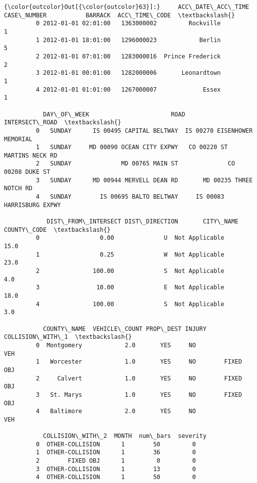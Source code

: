 \documentclass[11pt]{article}
\begin{document}
\begin{Verbatim}[commandchars=\\\{\}]
{\color{outcolor}Out[{\color{outcolor}63}]:}     ACC\_DATE\_ACC\_TIME  CASE\_NUMBER           BARRACK  ACC\_TIME\_CODE  \textbackslash{}
         0 2012-01-01 02:01:00   1363000002         Rockville              1   
         1 2012-01-01 18:01:00   1296000023            Berlin              5   
         2 2012-01-01 07:01:00   1283000016  Prince Frederick              2   
         3 2012-01-01 00:01:00   1282000006       Leonardtown              1   
         4 2012-01-01 01:01:00   1267000007             Essex              1   
         
           DAY\_OF\_WEEK                       ROAD                INTERSECT\_ROAD  \textbackslash{}
         0   SUNDAY      IS 00495 CAPITAL BELTWAY  IS 00270 EISENHOWER MEMORIAL   
         1   SUNDAY     MD 00090 OCEAN CITY EXPWY   CO 00220 ST MARTINS NECK RD   
         2   SUNDAY              MD 00765 MAIN ST              CO 00208 DUKE ST   
         3   SUNDAY      MD 00944 MERVELL DEAN RD       MD 00235 THREE NOTCH RD   
         4   SUNDAY        IS 00695 BALTO BELTWAY     IS 00083 HARRISBURG EXPWY   
         
            DIST\_FROM\_INTERSECT DIST\_DIRECTION       CITY\_NAME  COUNTY\_CODE  \textbackslash{}
         0                 0.00              U  Not Applicable         15.0   
         1                 0.25              W  Not Applicable         23.0   
         2               100.00              S  Not Applicable          4.0   
         3                10.00              E  Not Applicable         18.0   
         4               100.00              S  Not Applicable          3.0   
         
           COUNTY\_NAME  VEHICLE\_COUNT PROP\_DEST INJURY COLLISION\_WITH\_1  \textbackslash{}
         0  Montgomery            2.0       YES     NO              VEH   
         1   Worcester            1.0       YES     NO        FIXED OBJ   
         2     Calvert            1.0       YES     NO        FIXED OBJ   
         3   St. Marys            1.0       YES     NO        FIXED OBJ   
         4   Baltimore            2.0       YES     NO              VEH   
         
           COLLISION\_WITH\_2  MONTH  num\_bars  severity  
         0  OTHER-COLLISION      1        50         0  
         1  OTHER-COLLISION      1        36         0  
         2        FIXED OBJ      1         0         0  
         3  OTHER-COLLISION      1        13         0  
         4  OTHER-COLLISION      1        50         0  
\end{Verbatim}
            
\end{document}
